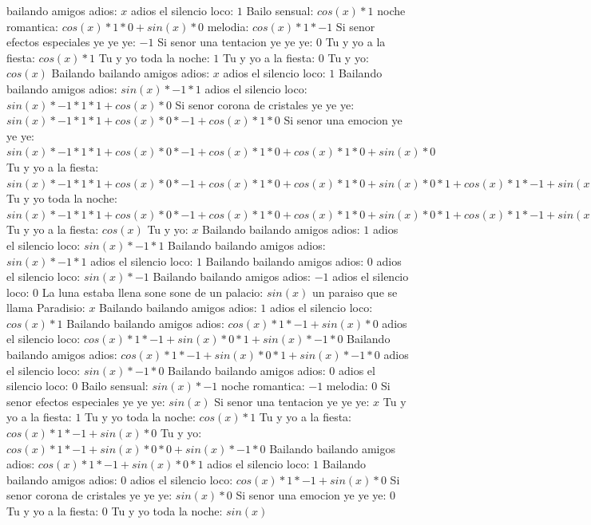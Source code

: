 \documentclass{article}
\begin{document}
bailando amigos adios: $x$ adios el silencio loco: $1$  \newline Bailo sensual: $cos(x)*1$ noche romantica: $cos(x)*1*0+sin(x)*0$ melodia: $cos(x)*1*-1$ Si senor efectos especiales ye ye ye: $-1$ Si senor una tentacion ye ye ye: $0$  \newline Tu y yo a la fiesta: $cos(x)*1$ Tu y yo toda la noche: $1$ Tu y yo a la fiesta: $0$  \newline Tu y yo: $cos(x)$  \newline Bailando bailando amigos adios: $x$ adios el silencio loco: $1$  \newline Bailando bailando amigos adios: $sin(x)*-1*1$ adios el silencio loco: $sin(x)*-1*1*1+cos(x)*0$ Si senor corona de cristales ye ye ye: ${sin(x)*-1*1*1+cos(x)*0}*-1+cos(x)*1*0$ Si senor una emocion ye ye ye: ${sin(x)*-1*1*1+cos(x)*0}*-1+cos(x)*1*0+cos(x)*1*0+sin(x)*0$ Tu y yo a la fiesta: ${{sin(x)*-1*1*1+cos(x)*0}*-1+cos(x)*1*0+cos(x)*1*0+sin(x)*0}*1+{cos(x)*1*-1+sin(x)*0}*0$ Tu y yo toda la noche: ${{sin(x)*-1*1*1+cos(x)*0}*-1+cos(x)*1*0+cos(x)*1*0+sin(x)*0}*1+{cos(x)*1*-1+sin(x)*0}*0+{cos(x)*1*-1+sin(x)*0}*0+sin(x)*-1*0$ Tu y yo a la fiesta: $cos(x)$  \newline Tu y yo: $x$ Bailando bailando amigos adios: $1$  \newline adios el silencio loco: $sin(x)*-1*1$ Bailando bailando amigos adios: $sin(x)*-1*1$ adios el silencio loco: $1$ Bailando bailando amigos adios: $0$  \newline adios el silencio loco: $sin(x)*-1$ Bailando bailando amigos adios: $-1$ adios el silencio loco: $0$  \newline La luna estaba llena sone sone de un palacio: $sin(x)$  \newline un paraiso que se llama Paradisio: $x$ Bailando bailando amigos adios: $1$  \newline adios el silencio loco: $cos(x)*1$ Bailando bailando amigos adios: $cos(x)*1*-1+sin(x)*0$ adios el silencio loco: ${cos(x)*1*-1+sin(x)*0}*1+sin(x)*-1*0$ Bailando bailando amigos adios: ${cos(x)*1*-1+sin(x)*0}*1+sin(x)*-1*0$  \newline adios el silencio loco: $sin(x)*-1*0$ Bailando bailando amigos adios: $0$ adios el silencio loco: $0$  \newline Bailo sensual: $sin(x)*-1$ noche romantica: $-1$ melodia: $0$  \newline Si senor efectos especiales ye ye ye: $sin(x)$  \newline Si senor una tentacion ye ye ye: $x$ Tu y yo a la fiesta: $1$  \newline Tu y yo toda la noche: $cos(x)*1$ Tu y yo a la fiesta: $cos(x)*1*-1+sin(x)*0$ Tu y yo: ${cos(x)*1*-1+sin(x)*0}*0+sin(x)*-1*0$ Bailando bailando amigos adios: ${cos(x)*1*-1+sin(x)*0}*1$ adios el silencio loco: $1$ Bailando bailando amigos adios: $0$  \newline adios el silencio loco: $cos(x)*1*-1+sin(x)*0$  \newline Si senor corona de cristales ye ye ye: $sin(x)*0$ Si senor una emocion ye ye ye: $0$ Tu y yo a la fiesta: $0$  \newline Tu y yo toda la noche: $sin(x)$  
\end{document}
